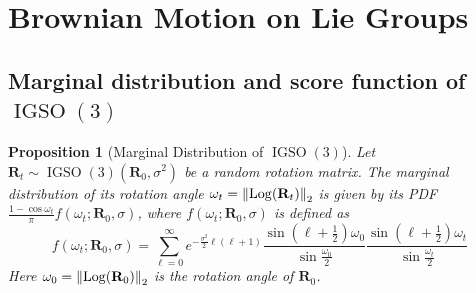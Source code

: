 \documentclass{article}
\theoremstyle{plain}
\newtheorem{proposition}[theorem]{Proposition}
\theoremstyle{definition}
\theoremstyle{remark}
\DeclareMathOperator{\IGSO}{IGSO}
\DeclareMathOperator{\Log}{\operatorname{Log}}
\begin{document}
\section{Brownian Motion on Lie Groups}

\subsection{Marginal distribution and score function of $\IGSO(3)$}

\begin{proposition}[Marginal Distribution of $\IGSO(3)$]\label{prop:marginal_igso3}
    Let $\mathbf{R}_t \sim \IGSO(3)(\mathbf{R}_0, \sigma^2)$ be a random rotation matrix. The marginal distribution of its rotation angle $\omega_t = \norm{\Log(\mathbf{R}_t)}_2$ is given by its PDF $\frac{1-\cos\omega_t}{\pi}f(\omega_t; \mathbf{R}_0, \sigma)$, where $f(\omega_t; \mathbf{R}_0, \sigma)$ is defined as
    \begin{equation}
        f(\omega_t; \mathbf{R}_0, \sigma) = \sum_{\ell=0}^{\infty} e^{-\frac{\sigma^2}{2}\ell(\ell+1)}\frac{\sin\left(\ell+\frac{1}{2}\right)\omega_0}{\sin \frac{\omega_0}{2}}\frac{\sin\left(\ell+\frac{1}{2}\right)\omega_t}{\sin \frac{\omega_t}{2}}
    \end{equation}
    Here $\omega_0 = \norm{\Log(\mathbf{R}_0)}_2$ is the rotation angle of $\mathbf{R}_0$.
\end{proposition}
\end{document}
